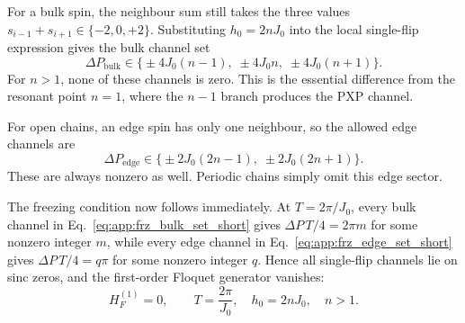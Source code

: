 \documentclass[aps,prb,reprint,twocolumn,amsmath,amssymb,citeautoscript]{revtex4-2}
\begin{document}
For a bulk spin, the neighbour sum still takes the three values
$s_{i-1}+s_{i+1}\in\{-2,0,+2\}$. Substituting $h_0=2nJ_0$ into the
local single-flip expression gives the bulk channel set
\begin{equation}
\Delta P_{\mathrm{bulk}}
\in
\bigl\{\pm 4J_0(n-1),\;\pm 4J_0 n,\;\pm 4J_0(n+1)\bigr\}.
\label{eq:app:frz_bulk_set_short}
\end{equation}
For $n>1$, none of these channels is zero. This is the essential
difference from the resonant point $n=1$, where the $n-1$ branch
produces the PXP channel.

For open chains, an edge spin has only one neighbour, so the allowed
edge channels are
\begin{equation}
\Delta P_{\mathrm{edge}}
\in
\bigl\{\pm 2J_0(2n-1),\;\pm 2J_0(2n+1)\bigr\}.
\label{eq:app:frz_edge_set_short}
\end{equation}
These are always nonzero as well. Periodic chains simply omit this
edge sector.

The freezing condition now follows immediately. At
$T=2\pi/J_0$, every bulk channel in
Eq.~\eqref{eq:app:frz_bulk_set_short} gives
$\Delta P\,T/4 = 2\pi m$ for some nonzero integer $m$, while every
edge channel in Eq.~\eqref{eq:app:frz_edge_set_short} gives
$\Delta P\,T/4 = q\pi$ for some nonzero integer $q$. Hence all
single-flip channels lie on sinc zeros, and the first-order Floquet
generator vanishes:
\begin{equation}
H_F^{(1)}=0,
\qquad
T=\frac{2\pi}{J_0},\quad h_0=2nJ_0,\quad n>1.
\label{eq:app:frz_final_short}
\end{equation}
\end{document}
